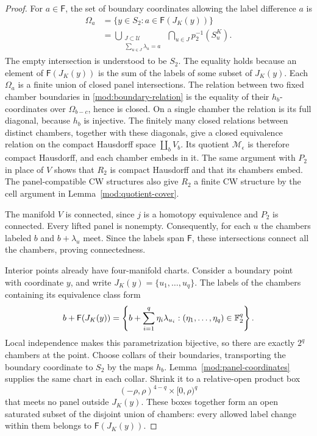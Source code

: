 \begin{proof}
For \(a\in\mathsf F\), the set of boundary coordinates allowing the
label difference \(a\) is
\begin{equation}\label{mod:allowed-coordinates}
 \begin{split}
 \Omega_a
   &=\{y\in S_2:a\in\mathsf F(J_K(y))\}\\
   &=\bigcup_{\substack{J\subset\mathcal U\\
                         \sum_{u\in J}\lambda_u=a}}
       \ \bigcap_{u\in J}p_2^{-1}(S^K_u).
 \end{split}
\end{equation}
The empty intersection is understood to be \(S_2\).  The equality
holds because an element of \(\mathsf F(J_K(y))\) is the sum of the
labels of some subset of \(J_K(y)\).  Each \(\Omega_a\) is a finite
union of closed panel intersections.  The relation between two fixed
chamber boundaries in \eqref{mod:boundary-relation} is the equality
of their \(h_b\)-coordinates over \(\Omega_{b-c}\), hence is closed.
On a single chamber the relation is its full diagonal, because
\(h_b\) is injective.  The finitely many closed relations between
distinct chambers, together with these diagonals, give a closed
equivalence relation on the
compact Hausdorff space \(\coprod_b V_b\).  Its quotient
\(\mathcal M_\epsilon\) is therefore compact Hausdorff, and each
chamber embeds in it.  The same argument with \(P_2\) in place of
\(V\) shows that \(R_2\) is compact Hausdorff and that its chambers
embed.  The panel-compatible CW structures also give \(R_2\) a
finite CW structure by the cell argument in
Lemma~\ref{mod:quotient-cover}.

The manifold \(V\) is connected, since \(j\) is a homotopy equivalence
and \(P_2\) is connected.  Every lifted panel is nonempty.
Consequently, for each \(u\) the chambers labeled \(b\) and
\(b+\lambda_u\) meet.  Since the labels span \(\mathsf F\), these
intersections connect all the chambers, proving connectedness.

Interior points already have four-manifold charts.  Consider a
boundary point with coordinate \(y\), and write
\(J_K(y)=\{u_1,\ldots,u_q\}\).  The labels of the chambers containing
its equivalence class form
\[
 b+\mathsf F(J_K(y))
   =\left\{b+\sum_{i=1}^q\eta_i\lambda_{u_i}:
                    (\eta_1,\ldots,\eta_q)\in\mathbb F_2^q\right\}.
\]
Local independence makes this parametrization bijective, so there are
exactly \(2^q\) chambers at the point.  Choose collars of their
boundaries, transporting the boundary coordinate to \(S_2\) by the
maps \(h_b\).  Lemma~\ref{mod:panel-coordinates} supplies the same
chart in each collar.  Shrink it to a relative-open product box
\[
 (-\rho,\rho)^{4-q}\times[0,\rho)^q
\]
that meets no panel outside \(J_K(y)\).  These boxes together form an
open saturated subset of the disjoint union of chambers: every allowed
label change within them belongs to \(\mathsf F(J_K(y))\).


\end{proof}
